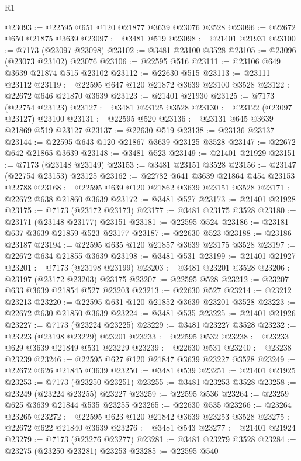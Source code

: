\begin{lexlean}{R1}
\begin{coremodule}
@23093 := @22595 @651 @120 @21877 @3639 @23076 @3528
@23096 := @22672 @650 @21875 @3639
@23097 := @3481 @519
@23098 := @21401 @21931
@23100 := @7173 (@23097 @23098)
@23102 := @3481 @23100 @3528
@23105 := @23096 (@23073 @23102) @23076
@23106 := @22595 @516
@23111 := @23106 @649 @3639 @21874 @515 @23102
@23112 := @22630 @515
@23113 := @23111 @23112
@23119 := @22595 @647 @120 @21872 @3639 @23100 @3528
@23122 := @22672 @646 @21870 @3639
@23123 := @21401 @21930
@23125 := @7173 (@22754 @23123)
@23127 := @3481 @23125 @3528
@23130 := @23122 (@23097 @23127) @23100
@23131 := @22595 @520
@23136 := @23131 @645 @3639 @21869 @519 @23127
@23137 := @22630 @519
@23138 := @23136 @23137
@23144 := @22595 @643 @120 @21867 @3639 @23125 @3528
@23147 := @22672 @642 @21865 @3639
@23148 := @3481 @523
@23149 := @21401 @21929
@23151 := @7173 (@23148 @23149)
@23153 := @3481 @23151 @3528
@23156 := @23147 (@22754 @23153) @23125
@23162 := @22782 @641 @3639 @21864 @454 @23153 @22788
@23168 := @22595 @639 @120 @21862 @3639 @23151 @3528
@23171 := @22672 @638 @21860 @3639
@23172 := @3481 @527
@23173 := @21401 @21928
@23175 := @7173 (@23172 @23173)
@23177 := @3481 @23175 @3528
@23180 := @23171 (@23148 @23177) @23151
@23181 := @22595 @524
@23186 := @23181 @637 @3639 @21859 @523 @23177
@23187 := @22630 @523
@23188 := @23186 @23187
@23194 := @22595 @635 @120 @21857 @3639 @23175 @3528
@23197 := @22672 @634 @21855 @3639
@23198 := @3481 @531
@23199 := @21401 @21927
@23201 := @7173 (@23198 @23199)
@23203 := @3481 @23201 @3528
@23206 := @23197 (@23172 @23203) @23175
@23207 := @22595 @528
@23212 := @23207 @633 @3639 @21854 @527 @23203
@23213 := @22630 @527
@23214 := @23212 @23213
@23220 := @22595 @631 @120 @21852 @3639 @23201 @3528
@23223 := @22672 @630 @21850 @3639
@23224 := @3481 @535
@23225 := @21401 @21926
@23227 := @7173 (@23224 @23225)
@23229 := @3481 @23227 @3528
@23232 := @23223 (@23198 @23229) @23201
@23233 := @22595 @532
@23238 := @23233 @629 @3639 @21849 @531 @23229
@23239 := @22630 @531
@23240 := @23238 @23239
@23246 := @22595 @627 @120 @21847 @3639 @23227 @3528
@23249 := @22672 @626 @21845 @3639
@23250 := @3481 @539
@23251 := @21401 @21925
@23253 := @7173 (@23250 @23251)
@23255 := @3481 @23253 @3528
@23258 := @23249 (@23224 @23255) @23227
@23259 := @22595 @536
@23264 := @23259 @625 @3639 @21844 @535 @23255
@23265 := @22630 @535
@23266 := @23264 @23265
@23272 := @22595 @623 @120 @21842 @3639 @23253 @3528
@23275 := @22672 @622 @21840 @3639
@23276 := @3481 @543
@23277 := @21401 @21924
@23279 := @7173 (@23276 @23277)
@23281 := @3481 @23279 @3528
@23284 := @23275 (@23250 @23281) @23253
@23285 := @22595 @540

\end{coremodule}
\end{lexlean}
